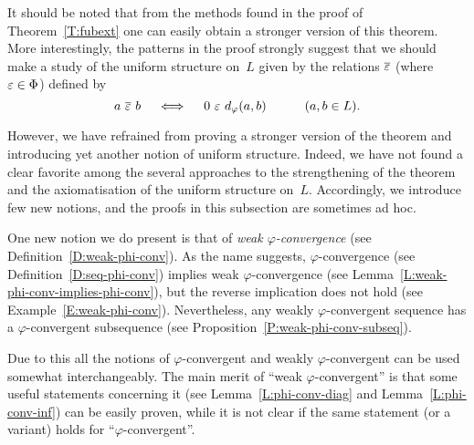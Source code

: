\documentclass[main.tex]{subfiles}
\begin{document}
It should be noted that from the methods
found in the proof of Theorem~\ref{T:fubext}
one can easily obtain a stronger version of this theorem.
More interestingly,
the patterns in the proof strongly suggest that
we should make a study of the uniform structure on~$L$
given by the relations $\overline{\varepsilon}$ (where $\varepsilon\in\Phi$) defined by
\begin{equation*}
a \ \ol{\ve}\ b \quad\iff\quad 0\ \ve\ \ld\varphi(a,b)\qquad\quad(a,b\in L).
\end{equation*}

However, we have refrained from proving a stronger version of the theorem
and introducing yet another notion of uniform structure.
Indeed,
we have not found a clear favorite 
 among the several approaches to the strengthening
of the theorem and the axiomatisation of the uniform structure on~$L$.
Accordingly,
we introduce few new notions,
and the proofs in this subsection are sometimes ad hoc.

One new notion we do present is that of
\emph{weak $\varphi$-convergence}
(see Definition~\ref{D:weak-phi-conv}).
As the name suggests,
$\varphi$-convergence (see Definition~\ref{D:seq-phi-conv})
implies weak $\varphi$-convergence
(see Lemma~\ref{L:weak-phi-conv-implies-phi-conv}),
but the reverse implication does not hold
(see Example~\ref{E:weak-phi-conv}).
Nevertheless,
any weakly $\varphi$-convergent sequence
has a $\varphi$-convergent subsequence
(see Proposition~\ref{P:weak-phi-conv-subseq}).

Due to this all 
the notions of $\varphi$-convergent
and weakly $\varphi$-convergent
can be used somewhat interchangeably.
The main merit of ``weak $\varphi$-convergent''
is that some useful statements concerning it
(see Lemma~\ref{L:phi-conv-diag} and  Lemma~\ref{L:phi-conv-inf}) 
can be easily proven,
while it is not clear if the same statement (or a variant) holds for
``$\varphi$-convergent''.
\end{document}

